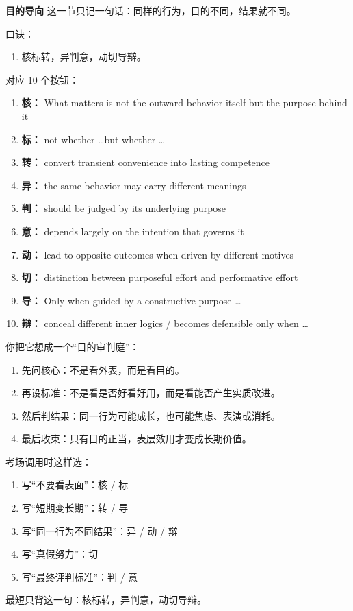 ﻿\documentclass[lang=cn,11pt]{elegantbook}
\begin{document}
\begin{note}
\textbf{目的导向} 这一节只记一句话：同样的行为，目的不同，结果就不同。

口诀：

\begin{enumerate}
  \item 核标转，异判意，动切导辩。
\end{enumerate}

对应 10 个按钮：

\begin{enumerate}
  \item \textbf{核：} What matters is not the outward behavior itself but the purpose behind it
  \item \textbf{标：} not whether \ldots but whether \ldots
  \item \textbf{转：} convert transient convenience into lasting competence
  \item \textbf{异：} the same behavior may carry different meanings
  \item \textbf{判：} should be judged by its underlying purpose
  \item \textbf{意：} depends largely on the intention that governs it
  \item \textbf{动：} lead to opposite outcomes when driven by different motives
  \item \textbf{切：} distinction between purposeful effort and performative effort
  \item \textbf{导：} Only when guided by a constructive purpose \ldots
  \item \textbf{辩：} conceal different inner logics / becomes defensible only when \ldots
\end{enumerate}

你把它想成一个“目的审判庭”：

\begin{enumerate}
  \item 先问核心：不是看外表，而是看目的。
  \item 再设标准：不是看是否好看好用，而是看能否产生实质改进。
  \item 然后判结果：同一行为可能成长，也可能焦虑、表演或消耗。
  \item 最后收束：只有目的正当，表层效用才变成长期价值。
\end{enumerate}

考场调用时这样选：

\begin{enumerate}
  \item 写“不要看表面”：核 / 标
  \item 写“短期变长期”：转 / 导
  \item 写“同一行为不同结果”：异 / 动 / 辩
  \item 写“真假努力”：切
  \item 写“最终评判标准”：判 / 意
\end{enumerate}

最短只背这一句：核标转，异判意，动切导辩。
\end{note}
\end{document}
